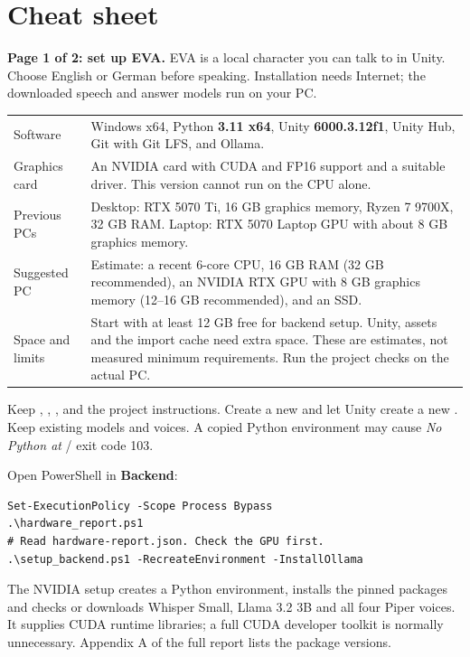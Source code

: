 \begingroup
\fontsize{10}{12.2}\selectfont
\setlength{\parskip}{4pt}
\section{Cheat sheet}
\textbf{Page 1 of 2: set up EVA.} EVA is a local character you can talk to in
Unity. Choose English or German before speaking. Installation needs Internet;
the downloaded speech and answer models run on your PC.

\begin{tabularx}{\linewidth}{@{}P{29mm}Y@{}}
\toprule
Software & Windows x64, Python \textbf{3.11 x64}, Unity \textbf{6000.3.12f1},
Unity Hub, Git with Git LFS, and Ollama.\\
Graphics card & An NVIDIA card with CUDA and FP16 support and a suitable driver.
This version cannot run on the CPU alone.\\
Previous PCs & Desktop: RTX 5070 Ti, 16 GB graphics memory, Ryzen 7 9700X,
32 GB RAM. Laptop: RTX 5070 Laptop GPU with about 8 GB graphics memory.\\
Suggested PC & Estimate: a recent 6-core CPU, 16 GB RAM (32 GB recommended),
an NVIDIA RTX GPU with 8 GB graphics memory (12--16 GB recommended), and an SSD.\\
Space and limits & Start with at least 12 GB free for backend setup. Unity,
assets and the import cache need extra space. These are estimates, not measured
minimum requirements. Run the project checks on the actual PC.\\
\bottomrule
\end{tabularx}

Keep , , , 
and the project instructions. Create a new 
and let Unity create a new . Keep existing models and voices.
A copied Python environment may cause \textit{No Python at} / exit code 103.

Open PowerShell in \textbf{Backend}:
\begin{lstlisting}[caption={Check the PC and install the backend},label={code:setup}]
Set-ExecutionPolicy -Scope Process Bypass
.\hardware_report.ps1
# Read hardware-report.json. Check the GPU first.
.\setup_backend.ps1 -RecreateEnvironment -InstallOllama
\end{lstlisting}
The NVIDIA setup creates a Python environment, installs the pinned packages and
checks or downloads Whisper Small, Llama 3.2 3B and all four Piper voices.
It supplies CUDA runtime libraries; a full CUDA developer toolkit is normally
unnecessary. Appendix A of the full report lists the package versions.

